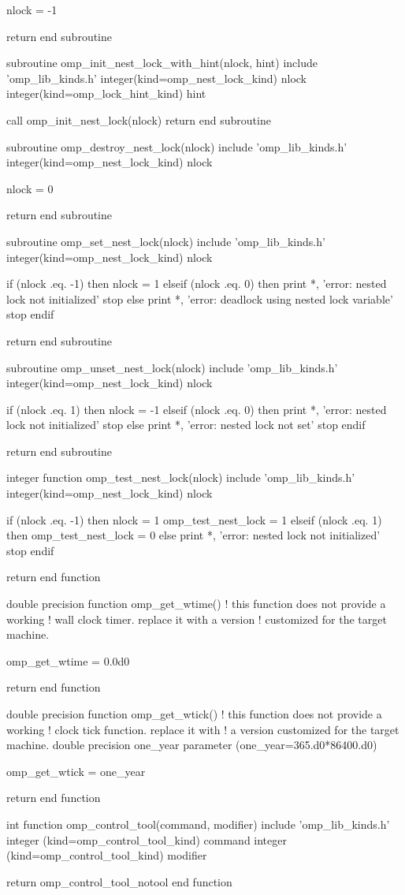 {\begin{codepar}
  nlock = -1

  return
end subroutine

subroutine omp\_init\_nest\_lock\_with\_hint(nlock, hint)
  include 'omp\_lib\_kinds.h'
  integer(kind=omp\_nest\_lock\_kind) nlock
  integer(kind=omp\_lock\_hint\_kind) hint
  
  call omp\_init\_nest\_lock(nlock)
  return
end subroutine

subroutine omp\_destroy\_nest\_lock(nlock)
  include 'omp\_lib\_kinds.h'
  integer(kind=omp\_nest\_lock\_kind) nlock

  nlock = 0

  return
end subroutine

subroutine omp\_set\_nest\_lock(nlock)
  include 'omp\_lib\_kinds.h'
  integer(kind=omp\_nest\_lock\_kind) nlock

  if (nlock .eq. -1) then
    nlock = 1
  elseif (nlock .eq. 0) then
    print *, 'error: nested lock not initialized'
    stop
  else
    print *, 'error: deadlock using nested lock variable'
    stop
  endif

  return
end subroutine

subroutine omp\_unset\_nest\_lock(nlock)
  include 'omp\_lib\_kinds.h'
  integer(kind=omp\_nest\_lock\_kind) nlock

  if (nlock .eq. 1) then
    nlock = -1
  elseif (nlock .eq. 0) then
    print *, 'error: nested lock not initialized'
    stop
  else
    print *, 'error: nested lock not set'
    stop
  endif

  return
end subroutine

integer function omp\_test\_nest\_lock(nlock)
  include 'omp\_lib\_kinds.h'
  integer(kind=omp\_nest\_lock\_kind) nlock

  if (nlock .eq. -1) then
    nlock = 1
    omp\_test\_nest\_lock = 1
  elseif (nlock .eq. 1) then
    omp\_test\_nest\_lock = 0
  else
    print *, 'error: nested lock not initialized'
    stop
  endif

  return
end function

double precision function omp\_get\_wtime()
  ! this function does not provide a working
  ! wall clock timer. replace it with a version
  ! customized for the target machine.

  omp\_get\_wtime = 0.0d0

  return
end function

double precision function omp\_get\_wtick()
  ! this function does not provide a working
  ! clock tick function. replace it with
  ! a version customized for the target machine.
  double precision one\_year
  parameter (one\_year=365.d0*86400.d0)

  omp\_get\_wtick = one\_year

  return
end function

int function omp\_control\_tool(command, modifier)
  include 'omp\_lib\_kinds.h'
  integer (kind=omp\_control\_tool\_kind) command
  integer (kind=omp\_control\_tool\_kind) modifier

  return omp\_control\_tool\_notool
end function
\end{codepar}} %


